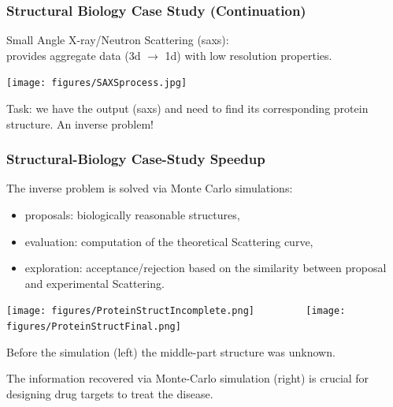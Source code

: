 \documentclass{beamer}
\renewcommand{\emph}[1]{\textcolor{structure}{#1}}
\begin{document}
\begin{frame}
  \frametitle{Structural Biology Case Study (Continuation)}
\bigskip
    Small Angle X-ray/Neutron Scattering ({\sc saxs}):  \\
        provides aggregate data (3d $\rightarrow$ 1d) with low resolution properties.


\begin{center} 
    \texttt{[image: figures/SAXSprocess.jpg]} 
\end{center} 

    Task: we have the output ({\sc saxs}) and need to find its corresponding protein structure.
        	An inverse problem!
\end{frame}

%

\begin{frame}
  \frametitle{Structural-Biology Case-Study Speedup}

    The inverse problem is solved via Monte Carlo simulations: \smallskip
\begin{itemize}
    \item \emph{proposals}: biologically reasonable structures, \smallskip
    \item \emph{evaluation}: computation of the theoretical Scattering curve, \smallskip
    \item \emph{exploration}: acceptance/rejection based on the similarity between 
						proposal and experimental Scattering. \smallskip
\end{itemize}


\begin{center} 
    \texttt{[image: figures/ProteinStructIncomplete.png]} 
$\mbox{ }\mbox{ }\mbox{ }\mbox{ }\mbox{ }\mbox{ }$
    \texttt{[image: figures/ProteinStructFinal.png]} 
\end{center} 

Before the simulation (left) the middle-part structure was unknown. \smallskip

The information recovered via Monte-Carlo simulation (right) is crucial for designing 
drug targets to treat the disease.

%

\end{frame}
\end{document}
